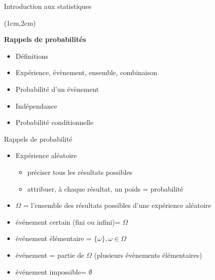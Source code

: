 \documentclass{beamer}
\begin{document}


\begin{frame}{Introduction aux statistiques}
\begin{textblock*}{\textwidth}(1cm,2cm)

\begin{center}{\bf \Large Rappels de probabilités} \end{center}
\vspace{0.3cm}
\begin{itemize}
\item Définitions 
\item Expérience, évènement, ensemble, combinaison
\item Probabilité d'un évènement
\item Indépendance
\item Probabilité conditionnelle  
\end{itemize}

\end{textblock*}

\end{frame}  



\begin{frame}{Rappels de probabilité}

\begin{itemize}
\item Expérience aléatoire 
\begin{itemize}
\item préciser tous les résultats possibles
\item attribuer, à chaque résultat, un poids = probabilité
\end{itemize}
\item $\Omega$ = l'ensemble des résultats possibles d'une expérience
aléatoire
\item événement certain (fini ou infini)= $ \Omega$ 
\item événement élémentaire = $\{\omega\}, \omega\in \Omega$
\item événement = partie de $\Omega$ (plusieurs évènements élémentaires)
\item événement impossible= $\emptyset$
\end{itemize}

\end{frame}
\end{document}
